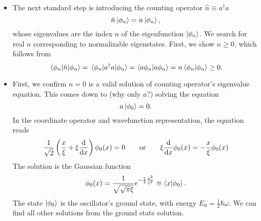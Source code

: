 \documentclass[11pt, a4paper]{article}
\newcommand{\eqtext}[1]{\qquad \text{#1} \qquad}
\renewcommand{\k}[1]{\ket{#1}}
\begin{document}
\begin{itemize}
	\item The next standard step is introducing the counting operator $ \hat{n} \equiv a^{\dagger}a $
	\begin{equation*}
		\hat{n}\k{\phi_{n}} = n \ket{\phi_{n}},
	\end{equation*}
	whose eigenvalues are the index $ n $ of the eigenfunction $ \ket{\phi_{n}} $. We search for real $ n $ corresponding to normalizable eigenstates. First, we show $ n \geq 0 $, which follows from
	\begin{equation*}
		\mel{\phi_{n}}{\hat{n}}{\phi_{n}} = \mel{\phi_{n}}{a^{\dagger}a}{\phi_{n}} = \braket{a \phi_{n}}{a \phi_{n}} = n \braket{\phi_{n}}{\phi_{n}} \geq 0.
	\end{equation*}
	
	\item First, we confirm $ n = 0 $ is a valid solution of counting operator's eigenvalue equation. This comes down to (why only $ a $?) solving the equation
	\begin{equation*}
		a \ket{\phi_{0}} = 0.
	\end{equation*}
	In the coordinate operator and wavefunction representation, the equation reads
	\begin{equation*}
		\frac{1}{\sqrt{2}}\left(\frac{x}{\xi} + \xi \dv{x}\right)\phi_{0}(x) = 0 \eqtext{or} \xi \dv{x} \phi_{0}(x) = - \frac{x}{\xi}\phi_{0}(x)
	\end{equation*}
	The solution is the Gaussian function
	\begin{equation*}
		\phi_{0}(x) = \frac{1}{\sqrt{\sqrt{\pi}\xi}}e^{-\frac{1}{2}\frac{x^{2}}{\xi^{2}}} \equiv \braket{x}{\phi_{0}}.
	\end{equation*}
	The state $ \k{\phi_{0}} $ is the oscillator's ground state, with energy $ E_{0} = \frac{1}{2}\hbar \omega $. We can find all other solutions from the ground state solution. 


\end{itemize}
\end{document}
